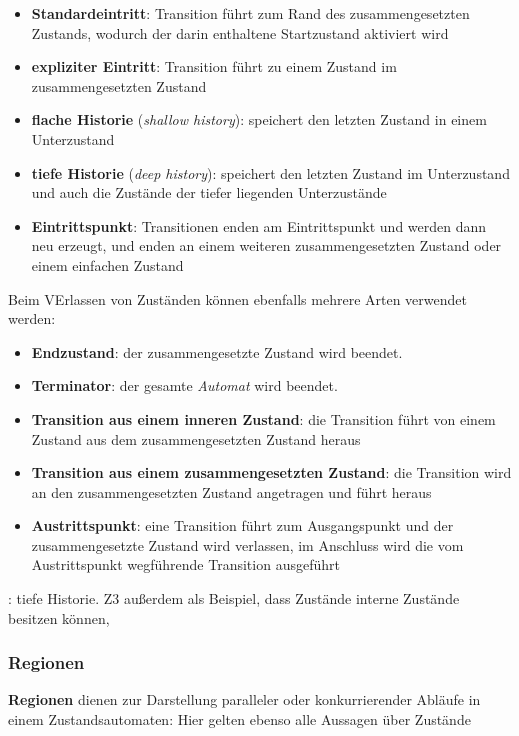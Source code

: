\begin{itemize}
    \item \textbf{Standardeintritt}: Transition führt zum Rand des zusammengesetzten Zustands, wodurch der darin enthaltene Startzustand aktiviert wird
    \item \textbf{expliziter Eintritt}: Transition führt zu einem Zustand im zusammengesetzten Zustand
    \item \textbf{flache Historie} (\textit{shallow history}): speichert den letzten Zustand in einem Unterzustand
    \item \textbf{tiefe Historie} (\textit{deep history}): speichert den letzten Zustand im Unterzustand und auch die Zustände der tiefer liegenden Unterzustände
    \item \textbf{Eintrittspunkt}: Transitionen enden am Eintrittspunkt und werden dann neu erzeugt, und enden an einem weiteren zusammengesetzten Zustand oder einem einfachen Zustand
\end{itemize}

\noindent
Beim VErlassen von Zuständen können ebenfalls mehrere Arten verwendet werden:

\begin{itemize}
    \item \textbf{Endzustand}: der zusammengesetzte Zustand wird beendet.
    \item \textbf{Terminator}: der gesamte \textit{Automat} wird beendet.
    \item \textbf{Transition aus einem inneren Zustand}: die Transition führt von einem Zustand aus dem zusammengesetzten Zustand heraus
    \item \textbf{Transition aus einem zusammengesetzten Zustand}: die Transition wird an den zusammengesetzten Zustand angetragen und führt heraus
    \item \textbf{Austrittspunkt}: eine Transition führt zum Ausgangspunkt und der zusammengesetzte Zustand wird verlassen, im Anschluss wird die vom Austrittspunkt wegführende Transition ausgeführt
\end{itemize}


\begin{tcolorbox}[colback=yellow!20]
\cite[Abb. 6.11.7, 342]{Bal05}: tiefe Historie. Z3 außerdem als Beispiel, dass Zustände interne Zustände besitzen können,
\end{tcolorbox}

\subsubsection*{Regionen}
\textbf{Regionen} dienen zur Darstellung paralleler oder konkurrierender Abläufe in einem Zustandsautomaten: Hier gelten ebenso alle Aussagen über Zustände

